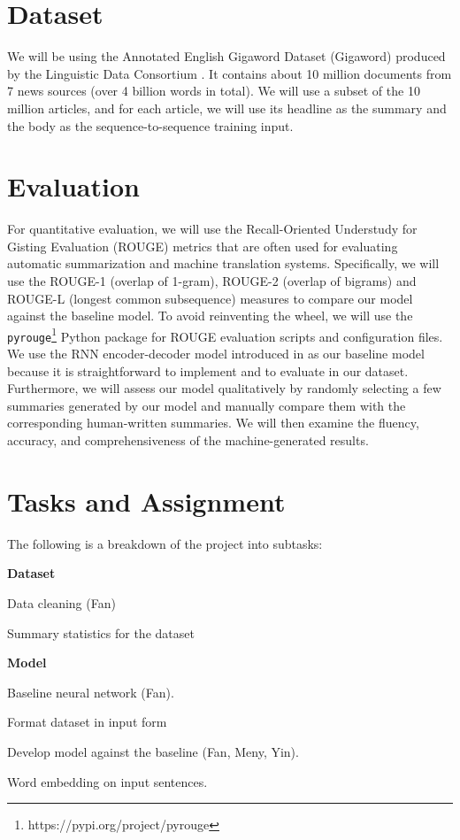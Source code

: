 \section{Dataset}
We will be using the Annotated English Gigaword Dataset (Gigaword) produced by the Linguistic Data Consortium \cite{napoles2012annotated}. It contains about 10 million documents from 7 news sources (over 4 billion words in total). We will use a subset of the 10 million articles, and for each article, we will use its headline as the summary and the body as the sequence-to-sequence training input.

\section{Evaluation}
For quantitative evaluation, we will use the Recall-Oriented Understudy for Gisting Evaluation (ROUGE) metrics that are often used for evaluating automatic summarization and machine translation systems. Specifically, we will use the ROUGE-1 (overlap of 1-gram), ROUGE-2 (overlap of bigrams) and ROUGE-L (longest common subsequence) measures to compare our model against the baseline model. To avoid reinventing the wheel, we will use the \texttt{pyrouge}\footnote{https://pypi.org/project/pyrouge} Python package for ROUGE evaluation scripts and configuration files. 
We use the RNN encoder-decoder model introduced in \cite{sutskever2014sequence} as our baseline model because it is straightforward to implement and to evaluate in our dataset. Furthermore, we will assess our model qualitatively by randomly selecting a few summaries generated by our model and manually compare them with the corresponding human-written summaries. We will then examine the fluency, accuracy, and comprehensiveness of the machine-generated results.

\section{Tasks and Assignment}

The following is a breakdown of the project into subtasks:

\noindent
\textbf{Dataset}
\begin{compactitem}
\item Data cleaning (Fan)
\item Summary statistics for the dataset
\end{compactitem}

\noindent
\textbf{Model}
\begin{compactitem}
\item Baseline neural network (Fan).
\item Format dataset in input form 
\item Develop model against the baseline (Fan, Meny, Yin).
\item Word embedding on input sentences.
\end{compactitem}

